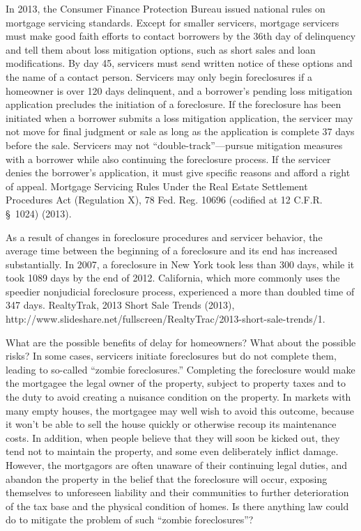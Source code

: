 In 2013, the Consumer Finance Protection Bureau issued national rules on
mortgage servicing standards. Except for smaller servicers, mortgage servicers
must make good faith efforts to contact borrowers by the 36th
day of delinquency and tell them about loss mitigation options, such as short
sales and loan modifications. By day 45, servicers must send written notice of
these options and the name of a contact person. Servicers may only begin
foreclosures if a homeowner is over 120 days delinquent, and a borrower's
pending loss mitigation application precludes the initiation of a foreclosure. 
If the foreclosure has been initiated when a borrower submits a loss mitigation
application, the servicer may not move for final judgment or sale as long as
the application is complete 37 days before the sale. Servicers may not
``double-track''---pursue mitigation measures with a borrower while also
continuing the foreclosure process. If the servicer denies the borrower's
application, it must give specific reasons and afford a right of appeal. 
Mortgage Servicing Rules Under the Real Estate Settlement Procedures Act
(Regulation X), 78 Fed. Reg. 10696 (codified at 12 C.F.R. \S~1024) (2013).

As a result of changes in foreclosure procedures and servicer behavior, the
average time between the beginning of a foreclosure and its end has increased
substantially. In 2007, a foreclosure in New York took less than 300 days,
while it took 1089 days by the end of 2012. California, which more commonly
uses the speedier nonjudicial foreclosure process, experienced a more than
doubled time of 347 days. RealtyTrak,
2013
Short Sale Trends (2013),
http://www.slideshare.net/fullscreen/RealtyTrac/2013-short-sale-trends/1.

What are the possible benefits of delay for homeowners? What about the possible
risks? In some cases, servicers initiate foreclosures but do not complete
them, leading to so-called ``zombie foreclosures.'' Completing the foreclosure
would make the mortgagee the legal owner of the property, subject to property
taxes and to the duty to avoid creating a nuisance condition on the property. 
In markets with many empty houses, the mortgagee may well wish to avoid this
outcome, because it won't be able to sell the house quickly or otherwise recoup
its maintenance costs. In addition, when people believe that they will soon be
kicked out, they tend not to maintain the property, and some even deliberately
inflict damage. However, the mortgagors are often unaware of their continuing
legal duties, and abandon the property in the belief that the foreclosure will
occur, exposing themselves to unforeseen liability and their communities to
further deterioration of the tax base and the physical condition of homes. Is
there anything law could do to mitigate the problem of such ``zombie
foreclosures''?

